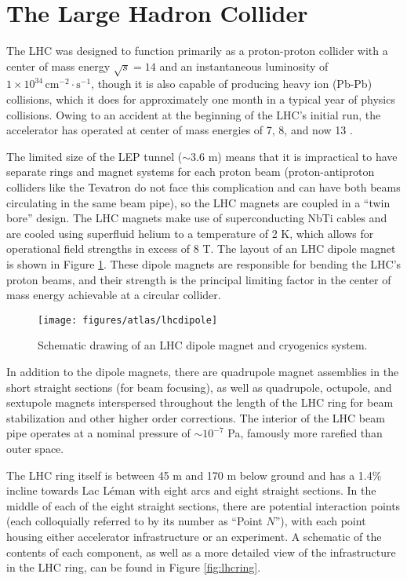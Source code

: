 \section{The Large Hadron Collider}
The LHC was designed to function primarily as a proton-proton collider with a center of mass energy $\sqrt{s}=14$ \TeV and an instantaneous luminosity of $1\times10^{34}\,\text{cm}^{-2}\cdot\text{s}^{-1}$, though it is also capable of producing heavy ion (Pb-Pb) collisions, which it does for approximately one month in a typical year of physics collisions.  Owing to an accident at the beginning of the LHC's initial run, the accelerator has operated at center of mass energies of 7, 8, and now 13 \TeV.

The limited size of the LEP tunnel ($\sim 3.6$ m) means that it is impractical to have separate rings and magnet systems for each proton beam (proton-antiproton colliders like the Tevatron do not face this complication and can have both beams circulating in the same beam pipe), so the LHC magnets are coupled in a ``twin bore'' design.  The LHC magnets make use of superconducting NbTi cables and are cooled using superfluid helium to a temperature of 2 K, which allows for operational field strengths in excess of 8 T.  The layout of an LHC dipole magnet is shown in Figure \ref{fig:lhcdipole}.  These dipole magnets are responsible for bending the LHC's proton beams, and their strength is the principal limiting factor in the center of mass energy achievable at a circular collider.

\begin{figure}[!htbp]\captionsetup{justification=centering}
  \centering
  \texttt{[image: figures/atlas/lhcdipole]}
  \caption{Schematic drawing of an LHC dipole magnet and cryogenics system.}
  \label{fig:lhcdipole}
\end{figure}

In addition to the dipole magnets, there are quadrupole magnet assemblies in the short straight sections (for beam focusing), as well as quadrupole, octupole, and sextupole magnets interspersed throughout the length of the LHC ring for beam stabilization and other higher order corrections.  The interior of the LHC beam pipe operates at a nominal pressure of $\sim10^{-7}$ Pa, famously more rarefied than outer space.

  The LHC ring itself is between 45 m and 170 m below ground and has a 1.4\% incline towards Lac L\'eman with eight arcs and eight straight sections.  In the middle of each of the eight straight sections, there are potential interaction points (each colloquially referred to by its number as ``Point $N$''), with each point housing either accelerator infrastructure or an experiment.  A schematic of the contents of each component, as well as a more detailed view of the infrastructure in the LHC ring, can be found in Figure \ref{fig:lhcring}.


